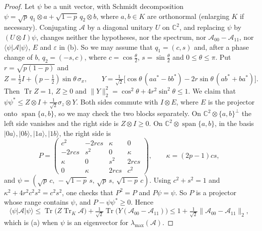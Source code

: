 \documentclass[11pt]{article}
\theoremstyle{remark}
\newcommand{\Tr}{\operatorname{Tr}}
\newcommand{\norm}[1]{\lVert #1\rVert}
\begin{document}
\begin{proof}
Let $\psi$ be a unit vector, with Schmidt decomposition
$\psi=\sqrt p\,q_1\otimes a+\sqrt{1-p}\,q_2\otimes b$, where $a,b\in K$ are orthonormal (enlarging $K$ if
necessary). Conjugating $\mathcal A$ by a diagonal unitary $U$ on $\mathbb C^2$, and replacing $\psi$ by
$(U\otimes I)\psi$, changes neither the hypotheses, nor the spectrum, nor $\mathcal A_{00}-\mathcal A_{11}$, nor
$\langle\psi|\mathcal A|\psi\rangle$, $E$ and $\varepsilon$ in (b). So we may assume that
$q_1=(c,s)$ and, after a phase change of $b$, $q_2=(-s,c)$, where $c=\cos\frac\theta2$, $s=\sin\frac\theta2$ and
$0\le\theta\le\pi$. Put $r=\sqrt{p(1-p)}$ and
\[
Z=\tfrac12I+(p-\tfrac12)\sin\theta\,\sigma_x,\qquad
Y=\tfrac1{\sqrt2}\big[\cos\theta\,(aa^*-bb^*)-2r\sin\theta\,(ab^*+ba^*)\big].
\]
Then $\Tr Z=1$, $Z\ge0$ and $\norm{Y}_2^2=\cos^2\theta+4r^2\sin^2\theta\le1$. We claim that
$\psi\psi^*\le Z\otimes I+\frac1{\sqrt2}\sigma_z\otimes Y$. Both sides commute with $I\otimes E$, where $E$ is the
projector onto $\operatorname{span}\{a,b\}$, so we may check the two blocks separately. On
$\mathbb C^2\otimes\{a,b\}^\perp$ the left side vanishes and the right side is $Z\otimes I\ge0$. On $\mathbb C^2\otimes\operatorname{span}\{a,b\}$, in the basis
$|0a\rangle,|0b\rangle,|1a\rangle,|1b\rangle$, the right side is
\[
P=\begin{pmatrix}c^2&-2rcs&\kappa&0\\-2rcs&s^2&0&\kappa\\\kappa&0&s^2&2rcs\\0&\kappa&2rcs&c^2\end{pmatrix},
\qquad\kappa=(2p-1)cs,
\]
and $\psi=(\sqrt p\,c,\,-\sqrt{1-p}\,s,\,\sqrt p\,s,\,\sqrt{1-p}\,c)$. Using $c^2+s^2=1$ and
$\kappa^2+4r^2c^2s^2=c^2s^2$, one checks that $P^2=P$ and $P\psi=\psi$. So $P$ is a projector whose range contains
$\psi$, and $P-\psi\psi^*\ge0$. Hence
\[
\langle\psi|\mathcal A|\psi\rangle\le\Tr\big(Z\Tr_K\mathcal A\big)
+\tfrac1{\sqrt2}\Tr\big(Y(\mathcal A_{00}-\mathcal A_{11})\big)\le1+\tfrac1{\sqrt2}\norm{\mathcal A_{00}-\mathcal A_{11}}_2 ,
\]
which is (a) when $\psi$ is an eigenvector for $\lambda_{\max}(\mathcal A)$.


\end{proof}
\end{document}
